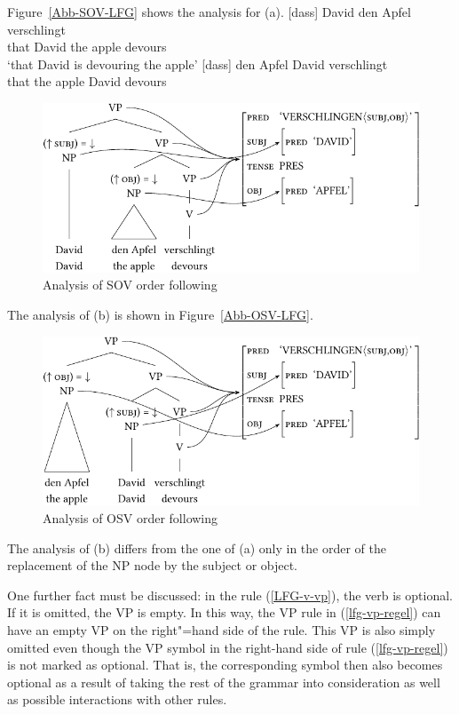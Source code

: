 \largerpage
Figure~\vref{Abb-SOV-LFG} shows the analysis for (a). 
\eal
\ex 
\gll {}[dass] David den Apfel verschlingt\\
      \spacebr{}that David the apple devours\\
\glt `that David is devouring the apple'
\ex 
\gll {}[dass] den Apfel David verschlingt\\
     \spacebr{}that the apple David devours\\
\zl
\begin{figure}
\centerline{%
\includegraphics{Figures/david-den-apfel-verschlingt-lfg-lsp-crop}
}
\caption{\label{Abb-SOV-LFG}Analysis of SOV order following \citet{Berman96a-u}}
\end{figure}%
The analysis of (b) is shown in Figure~\vref{Abb-OSV-LFG}.
\begin{figure}
\centerline{%
\includegraphics{Figures/den-apfel-david-verschlingt-lfg-lsp-crop}
}
\caption{\label{Abb-OSV-LFG}Analysis of OSV order following \citet{Berman96a-u}}
\end{figure}%
The analysis of (b) differs from the one of (a) only in the order of the replacement
of the NP node by the subject or object.

One further fact must be discussed: in the rule (\ref{LFG-v-vp}), the verb is optional. If it is
omitted, the VP is empty. In this way, the VP rule in (\ref{lfg-vp-regel}) can have an empty VP on
the right"=hand side of the rule. This VP is also simply
omitted even though the VP symbol in the right-hand side of rule (\ref{lfg-vp-regel})  is not marked as optional.
That is, the corresponding symbol then also becomes optional as a result of taking the rest of the grammar into consideration as well as possible interactions with
other rules.  

